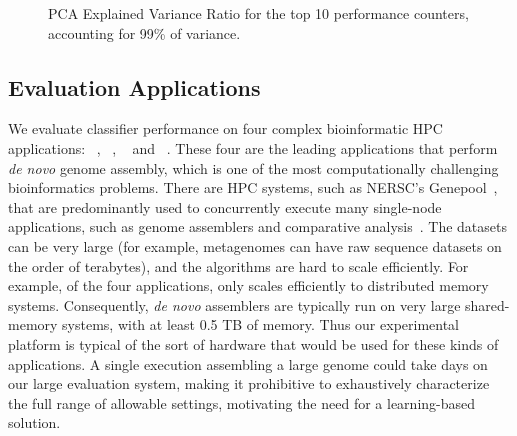 \begin{figure}[t]
  \begin{centering}
    
    \caption{PCA Explained Variance Ratio for the top 10 performance counters, accounting for 99\% of variance.}
    \label{fig:pca-evr}
  \end{centering}
\end{figure}


\subsection{Evaluation Applications}
\label{sec:setup-evaluation}

We evaluate classifier performance on four complex bioinformatic HPC applications: ~\cite{georganas2015hipmer}, ~\cite{peng2012idba}, ~\cite{li2015megahit} and ~\cite{nurk2016metaspades}.
These four are the leading applications that perform \emph{de novo} genome assembly, which is one of the most computationally challenging bioinformatics problems.
There are HPC systems, such as NERSC's Genepool~\cite{genepool}, that are predominantly used to concurrently execute many single-node applications, such as genome assemblers and comparative analysis~\cite{dosanjh2013extreme}.
The datasets can be very large (for example, metagenomes can have raw sequence datasets on the order of terabytes), and the algorithms are hard to scale efficiently.
For example, of the four applications, only  scales efficiently to distributed memory systems.
Consequently, \emph{de novo} assemblers are typically run on very large shared-memory systems, with at least 0.5 TB of memory.
Thus our experimental platform is typical of the sort of hardware that would be used for these kinds of applications.
A single execution assembling a large genome could take days on our large evaluation system, making it prohibitive to exhaustively characterize the full range of allowable settings, motivating the need for a learning-based solution.

